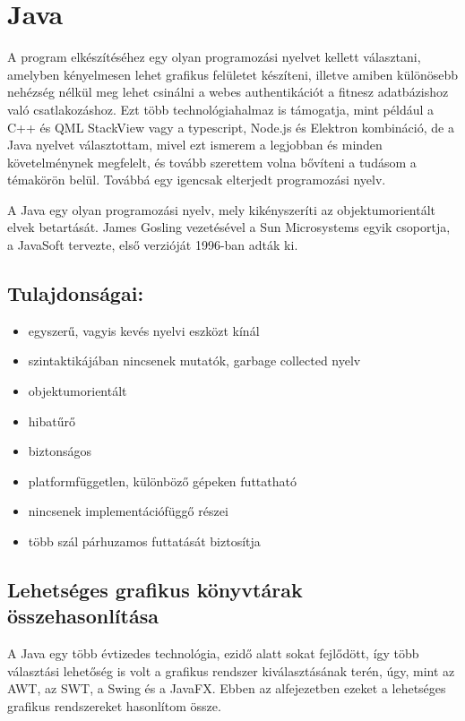 \section{Java}

A program elkészítéséhez egy olyan programozási nyelvet kellett választani, amelyben kényelmesen lehet grafikus felületet készíteni, illetve amiben különösebb nehézség nélkül meg lehet csinálni a webes authentikációt a fitnesz adatbázishoz való csatlakozáshoz.
Ezt több technológiahalmaz is támogatja, mint például a C++ és QML StackView vagy a typescript, Node.js és Elektron kombináció, de a Java nyelvet választottam, mivel ezt ismerem a legjobban és minden követelménynek megfelelt, és tovább szerettem volna bővíteni a tudásom a témakörön belül.
Továbbá egy igencsak elterjedt programozási nyelv.

A Java  egy olyan programozási nyelv, mely kikényszeríti az objektumorientált elvek betartását.
James Gosling vezetésével a Sun Microsystems egyik csoportja, a JavaSoft tervezte, első verzióját 1996-ban adták ki.\cite{java}


\subsection*{Tulajdonságai:}
\begin{itemize}
\setlength\itemsep{0em}
\item egyszerű, vagyis kevés nyelvi eszközt kínál
\item szintaktikájában nincsenek mutatók, garbage collected nyelv
\item objektumorientált
\item hibatűrő
\item biztonságos
\item platformfüggetlen, különböző gépeken futtatható
\item nincsenek implementációfüggő részei
\item több szál párhuzamos futtatását biztosítja
\end{itemize}

\subsection{Lehetséges grafikus könyvtárak összehasonlítása}

A Java egy több évtizedes technológia, ezidő alatt sokat fejlődött, így több választási lehetőség is volt a grafikus rendszer kiválasztásának terén, úgy, mint az AWT, az SWT, a Swing és a JavaFX.
Ebben az alfejezetben ezeket a lehetséges grafikus rendszereket hasonlítom össze. 

